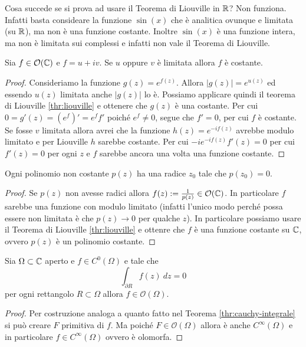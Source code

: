 \begin{remark}
	Cosa succede se si prova ad usare il Teorema di Liouville in $\mathbb{R}$? 
	Non funziona. Infatti basta consideare la funzione $\sin(x)$ che è 
	analitica ovunque e limitata (su $\mathbb{R}$), ma non è una funzione costante. 
	Inoltre $\sin(x)$ è una funzione intera, ma non è limitata sui complessi
	e infatti non vale il Teorema di Liouville.
\end{remark}

\begin{corollary}
  Sia $f \in \mathcal{O}(\mathbb{C})$ e $f = u + iv$. Se $u$ oppure $v$ è limitata
  allora $f$ è costante.
  \label{cor:stronger-liouville-constant-function}
\end{corollary}
\begin{proof}
  Consideriamo la funzione $g(z) = e^{f(z)}$. Allora $|g(z)| = e^{u(z)}$ ed
  essendo $u(z)$ limitata anche $|g(z)|$ lo è. Possiamo applicare quindi il
  teorema di Liouville \ref{thr:liouville} e ottenere che $g(z)$ è una
  costante. Per cui $0 = g'(z) = (e^f)' = e^f f'$ poiché $e^f \neq 0$, segue
  che $f' = 0$, per cui $f$ è costante.\\
  
  Se fosse $v$ limitata allora avrei che la funzione $h(z) = e^{-if(z)}$
  avrebbe modulo limitato e per Liouville $h$ sarebbe costante. Per cui
  $-i e^{-if(z)} f'(z) = 0$ per cui $f'(z) = 0$ per ogni $z$ e $f$ sarebbe
  ancora una volta una funzione costante.
\end{proof}

\begin{theorem}
  Ogni polinomio non costante $p(z)$ ha una radice $z_0$ tale che $p(z_0)
  = 0$. 
  \label{thr:fondamentale-dell-algebra}
\end{theorem}
\begin{proof}
  Se $p(z)$ non avesse radici allora $f(z) := \frac{1}{p(z)} \in
  \mathcal{O}(\mathbb{C})$. In particolare $f$ sarebbe una funzione con modulo
  limitato (infatti l'unico modo perché possa essere non limitata è che
  $p(z) \to 0$ per qualche $z$). In particolare possiamo usare il Teorema di
  Liouville \ref{thr:liouville} e ottenre che $f$ è una funzione costante su
  $\mathbb{C}$, ovvero $p(z)$ è un polinomio costante.
\end{proof}

\begin{theorem}[Morera]
  Sia $\Omega \subset \mathbb{C}$ aperto e $f \in C^0(\Omega)$ e tale che 
    \begin{equation*}
      \int_{\partial R} f(z)\ dz = 0 
    \end{equation*}
    per ogni rettangolo $R \subset \Omega$ allora $f \in
    \mathcal{O}(\Omega)$. 
    \label{thr:morera}
\end{theorem}
\begin{proof}
  Per costruzione analoga a quanto fatto nel Teorema
  \ref{thr:cauchy-integrale} si può creare $F$ primitiva di $f$. Ma poiché
  $F \in \mathcal{O}(\Omega)$ allora è anche $C^{\infty}(\Omega)$ e in
  particolare $f \in C^{\infty}(\Omega)$ ovvero è olomorfa. 
\end{proof}

